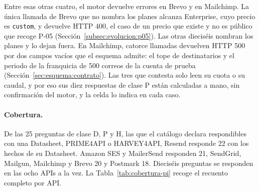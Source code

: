 Entre esas otras cuatro, el motor devuelve errores en Brevo y en Mailchimp.
La única llamada de Brevo que no nombra los planes alcanza Enterprise, cuyo precio es \texttt{custom}, y devuelve HTTP 400, el caso de un precio que existe y no es público que recoge P-05 (Sección~\ref{subsec:evolucion:p05}).
Las otras dieciséis nombran los planes y lo dejan fuera.
En Mailchimp, catorce llamadas devuelven HTTP 500 por dos campos vacíos que el esquema admite: el tope de destinatarios y el periodo de la franquicia de 500 correos de la cuenta de prueba (Sección~\ref{sec:esquema:contrato}).
Las tres que contesta solo leen su cuota o su caudal, y por eso sus diez respuestas de clase P están calculadas a mano, sin confirmación del motor, y la celda lo indica en cada caso.

\paragraph{Cobertura.}
De las 25 preguntas de clase D, P y H, las que el catálogo declara respondibles con una Datasheet, PRIME4API o HARVEY4API, Resend responde 22 con los hechos de su Datasheet.
Amazon SES y MailerSend responden 21, SendGrid, Mailgun, Mailchimp y Brevo 20 y Postmark 18.
Dieciséis preguntas se responden en las ocho APIs a la vez.
La Tabla~\ref{tab:cobertura-pi} recoge el recuento completo por API.

